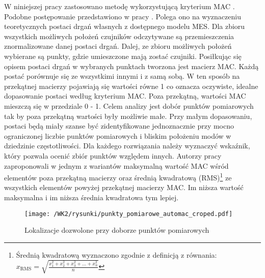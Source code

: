 W niniejszej pracy zastosowano metodę wykorzystującą kryterium MAC \parencite{Penny1994}. Podobne postępowanie przedstawiono w pracy \cite{Poprawa2018}. Polega ono na wyznaczeniu teoretycznych postaci drgań własnych z dostępnego modelu MES. Dla zbioru wszystkich możliwych położeń czujników odczytywane są przemieszczenia znormalizowane danej postaci drgań. Dalej, ze zbioru możliwych położeń wybierane są punkty, gdzie umieszczone mają zostać czujniki. Posiłkując się opisem postaci drgań w wybranych punktach tworzona jest macierz MAC. Każdą postać porównuje się ze wszystkimi innymi i z samą sobą. W ten sposób na przekątnej macierzy pojawiają się wartości równe 1 co oznacza oczywiste, idealne dopasowanie postaci według kryterium MAC. Poza przekątną, wartości MAC mieszczą się w przedziale 0 - 1. Celem analizy jest dobór punktów pomiarowych tak by poza przekątną wartości były możliwie małe. Przy małym dopasowaniu, postaci będą miały szanse być zidentyfikowane jednoznacznie przy mocno ograniczonej liczbie punktów pomiarowych i bliskim położeniu modów w dziedzinie częstotliwości. Dla każdego rozwiązania należy wyznaczyć wskaźnik, który pozwala ocenić zbiór punktów względem innych. Autorzy pracy \cite{Penny1994} zaproponowali w jednym z wariantów maksymalną wartość MAC wśród elementów poza przekątną macierzy oraz średnią kwadratową (RMS)\footnote{
	Średnią kwadratową wyznaczono zgodnie z definicją z równania: $x_{\text{RMS}}=\sqrt{\frac{x_1^2+x_2^2+x_3^2+\dots+x_n^2}{n}}$} 
ze wszystkich elementów powyżej przekątnej macierzy MAC. Im niższa wartość maksymalna i im niższa średnia kwadratowa tym lepiej.
\begin{figure}[hbt!]
	\centering
	\texttt{[image: /WK2/rysunki/punkty\_pomiarowe\_automac\_croped.pdf]}
	\captionsetup{justification=centering}
	\caption{Lokalizacje dozwolone przy doborze punktów pomiarowych}
	\label{fig: wk2_automac_points_all}
\end{figure}

